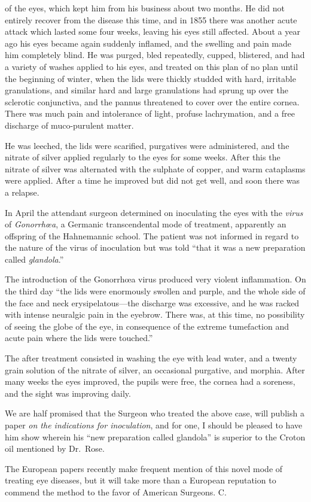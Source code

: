  of the eyes, which kept him from his business about two months.
He did not entirely recover from the disease this time, and in 1855
there was another acute attack which lasted some four weeks, leaving
his eyes still affected. About a year ago his eyes became again suddenly
inflamed, and the swelling and pain made him completely blind.
He was purged, bled repeatedly, cupped, blistered, and had a variety of
washes applied to his eyes, and treated on this plan of no plan until the
beginning of winter, when the lids were thickly studded with hard, irritable
granulations, and similar hard and large granulations had sprung
up over the sclerotic conjunctiva, and the pannus threatened to cover over
the entire cornea. There was much pain and intolerance of light, profuse
lachrymation, and a free discharge of muco-purulent matter.

He was leeched, the lids were scarified, purgatives were administered,
and the nitrate of silver applied regularly to the eyes for some weeks.
After this the nitrate of silver was alternated with the sulphate of copper,
and warm cataplasms were applied. After a time he improved
but did not get well, and soon there was a relapse.

In April the attendant surgeon determined on inoculating the eyes
with the \emph{virus} of \emph{Gonorrhœa}, a Germanic transcendental mode of
treatment, apparently an offspring of the Hahnemannic school. The patient
was not informed in regard to the nature of the virus of inoculation
but was told ``that it was a new preparation called \emph{glandola}.''

The introduction of the Gonorrhœa virus produced very violent inflammation.
On the third day ``the lids were enormously swollen and
purple, and the whole side of the face and neck erysipelatous---the discharge
was excessive, and he was racked with intense neuralgic pain in
the eyebrow. There was, at this time, no possibility of seeing the globe of
the eye, in consequence of the extreme tumefaction and acute pain
where the lids were touched.''

The after treatment consisted in washing the eye with lead water, and
a twenty grain solution of the nitrate of silver, an occasional purgative,
and morphia. After many weeks the eyes improved, the pupils were
free, the cornea had a soreness, and the sight was improving daily.

We are half promised that the Surgeon who treated the above case,
will publish a paper \emph{on the indications for inoculation}, and for one,
I should be pleased to have him show wherein his ``new preparation
called glandola'' is superior to the Croton oil mentioned by Dr.~Rose.

The European papers recently make frequent mention of this novel
mode of treating eye diseases, but it will take more than a European
reputation to commend the method to the favor of American Surgeons. \hfill{}C.\quad

\endinput
